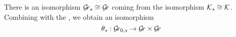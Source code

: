 \documentclass[draft]{article} %
\begin{document}
    
    There is an isomorphism $ \mathcal{G}\!r_s \cong \mathcal{G}\!r $ coming from the isomorphism $ \mathcal K_s \cong \mathcal K$. 
    Combining with the , we obtain an isomorphism
    $$
    \theta_s : \mathcal{G}\!r_{0,s} \rightarrow \mathcal{G}\!r \times \mathcal{G}\!r 
    $$

\begin{comment}
    \item \label{it:bd-th}
    We define a map $ \Grbd \rightarrow \Grth $ by 
    $$
        (V,\varphi,s)\mapsto (V, \varphi \big|_{D_\infty})\,.
    $$
    In group-theoretic terms, on the fibre over $ s $, this is the inclusion
    $$
        G(\CC[t, t^{-1}, (t-s)^{-1}])/ G(\CC[t]) \rightarrow G(\Kinf)/G(\CC[t])\,. 
    $$
    Finally, it is given in lattice terms on the fibre over $s$ as the identity on the lattice $(L,s)\mapsto L$ and using the inclusion $\CC[t, t^{-1}, (t-s)^{-1}]^m \rightarrow \Kinf^m$ on the ambient spaces.
\end{comment}
\end{document}
